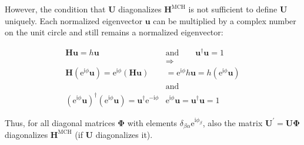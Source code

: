 \documentclass[a4paper,11pt,DIV=15,openany,twoside=false]{scrbook}
\newcommand{\tthdump}[1]{#1}
\newcommand{\E}{\ensuremath{\mathrm{e}}}
\newcommand{\I}{\ensuremath{\mathrm{i}}}
\renewcommand{\vec}[1]{\ensuremath{\mathbf{#1}}}
\begin{document}
However, the condition that $\vec{U}$ diagonalizes $\vec{H}^{\text{MCH}}$ is not sufficient to define $\vec{U}$ uniquely. Each normalized eigenvector $\vec{u}$ can be multiplied by a complex number on the unit circle and still remains a normalized eigenvector:
\tthdump{
  \begin{align}
    \vec{H}\vec{u}=h\vec{u}
    \qquad&\text{and}\qquad
    \vec{u}^\dagger\vec{u}=1\\
    &\Rightarrow\nonumber\\
    \vec{H}\left(\E^{\I\phi}\vec{u}\right)
    =\E^{\I\phi}\left(\vec{H}\vec{u}\right)
    &=\E^{\I\phi}h\vec{u}
    =h\left(\E^{\I\phi}\vec{u}\right)\\
    &\text{and}\nonumber\\
    \left(\E^{\I\phi}\vec{u}\right)^\dagger\left(\E^{\I\phi}\vec{u}\right)
    =\vec{u}^\dagger\E^{-\I\phi}&\E^{\I\phi}\vec{u}
    =\vec{u}^\dagger\vec{u}=1
  \end{align}
}
Thus, for all diagonal matrices $\boldsymbol{\Phi}$ with elements $\delta_{\beta\alpha}\E^{\I\phi_\beta}$, also the matrix $\vec{U}^\prime=\vec{U}\boldsymbol{\Phi}$ diagonalizes $\vec{H}^{\text{MCH}}$ (if $\vec{U}$ diagonalizes it).
\end{document}
